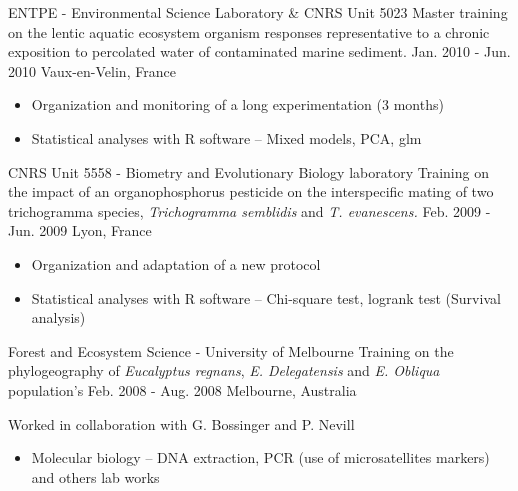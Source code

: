 \begin{cventries}
    \cventry
  {ENTPE - Environmental Science Laboratory \& CNRS Unit 5023}
  {Master training on the lentic aquatic ecosystem organism responses representative to a chronic exposition to percolated water of contaminated marine sediment.}
  {Jan. 2010 - Jun. 2010}
    {Vaux-en-Velin, France}
{
  \begin{cvitems}
          \begin{itemize}[label=$\bullet$,topsep=2pt]
    \item {Organization and monitoring of a long experimentation (3 months)}
    \item {Statistical analyses with R software – Mixed models, PCA, glm}
          \end{itemize}
\end{cvitems} 
  }


  \cventry
  {CNRS Unit 5558 - Biometry and Evolutionary Biology laboratory}
  {Training on the impact of an organophosphorus pesticide on the interspecific mating of two trichogramma species, \textit{Trichogramma semblidis} and \textit{T. evanescens.}}
  {Feb. 2009 - Jun. 2009}
    {Lyon, France}
{
  \begin{cvitems}
              \begin{itemize}[label=$\bullet$,topsep=2pt]
    \item {Organization and adaptation of a new protocol}
    \item {Statistical analyses with R software – Chi-square test, logrank test (Survival analysis)}
              \end{itemize}
\end{cvitems} 
}


      \cventry
  {Forest and Ecosystem Science - University of Melbourne}
  {Training on the phylogeography of \textit{Eucalyptus regnans}, \textit{E. Delegatensis} and \textit{E. Obliqua} population’s}
  {Feb. 2008 - Aug. 2008}
    {Melbourne, Australia}
{
    \begin{cvitems}
    \item []{\textnormal{Worked in collaboration with G. Bossinger and P. Nevill}}
    \              \begin{itemize}[label=$\bullet$,topsep=2pt]
item {Participated to a scientific project from beginning to end
        – Field work in difficult conditions in Australian Alps – Oral
        report in English}
          \item {Molecular biology – DNA extraction, PCR (use of microsatellites markers) and others lab works}
              \end{itemize}
\end{cvitems} 
  }



\end{cventries}
